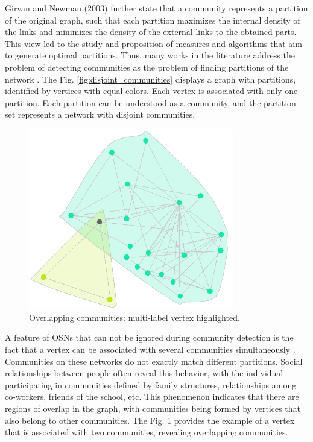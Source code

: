 
Girvan and Newman (2003)\cite{Girvan2003} further state that a community represents a partition of the original graph, such that each partition maximizes the internal density of the links and minimizes the density of the external links to the obtained parts. This view led to the study and proposition of measures and algorithms that aim to generate optimal partitions. Thus, many works in the literature address the problem of detecting communities as the problem of finding partitions of the network \cite{Dhumal2015, FORTUNATO201075, Lancichinetti2009b, Papadopoulos2012}. The Fig. \ref{fig:disjoint_communities} displays a graph with partitions, identified by vertices with equal colors. Each vertex is associated with only one partition. Each partition can be understood as a community, and the partition set represents a network with disjoint communities.

\begin{figure}[htb]
	\centering
	\includegraphics[width=0.80\textwidth]{fig/intro/overlap_communities.png}
	\caption{Overlapping communities: multi-label vertex highlighted.}
	\label{fig:overlap_communities}
\end{figure}

A feature of OSNs that can not be ignored during community detection is the fact that a vertex can be associated with several communities simultaneously \cite{Palla2005}. Communities on these networks do not exactly match different partitions. Social relationships between people often reveal this behavior, with the individual participating in communities defined by family structures, relationships among co-workers, friends of the school, etc. This phenomenon indicates that there are regions of overlap in the graph, with communities being formed by vertices that also belong to other communities. The Fig. \ref{fig:overlap_communities} provides the example of a vertex that is associated with two communities, revealing overlapping communities.

